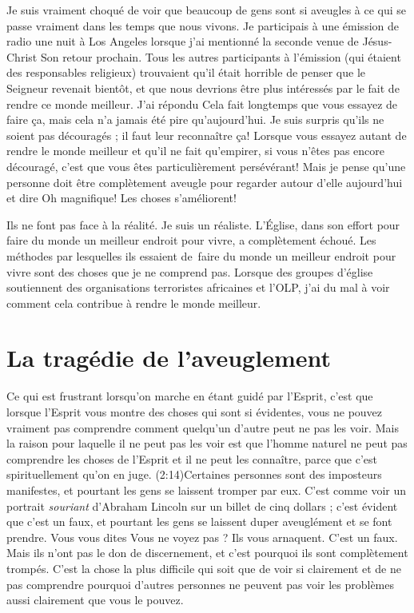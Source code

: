 Je suis vraiment choqué de voir que beaucoup de gens sont si aveugles à ce qui se passe
 vraiment dans les temps que nous vivons. Je participais à une émission de radio
 une nuit à Los Angeles lorsque j'ai mentionné la seconde venue
 de Jésus-Christ \ocadr Son retour prochain.
 Tous les autres participants à l'émission
 (qui étaient des responsables religieux) trouvaient qu'il était horrible
 de penser que le Seigneur revenait bientôt, et que nous devrions être plus
 intéressés par le fait de rendre ce monde meilleur. J'ai répondu\frcolon{}
 \Og Cela fait longtemps que vous essayez de faire ça, mais cela n'a jamais
 été pire qu'aujourd'hui. \Fg{}
 Je suis surpris qu'ils ne soient pas découragés ;
 il faut leur reconnaître ça!
 Lorsque vous essayez autant de rendre le monde meilleur et qu'il ne fait
 qu'empirer, si vous n'êtes pas encore découragé, c'est que vous êtes
 particulièrement persévérant!
 Mais je pense qu'une personne doit être complètement aveugle pour regarder
 autour d'elle aujourd'hui et dire\frcolon{}
 \Og Oh magnifique! Les choses s'améliorent! \Fg{}

Ils ne font pas face à la réalité. Je suis un réaliste.
 L'Église, dans son effort pour faire du monde un meilleur endroit
 pour vivre, a complètement échoué.
 Les méthodes par lesquelles ils essaient de~faire du monde un meilleur
 endroit pour vivre sont des choses que je ne comprend pas.
 Lorsque des groupes d'église soutiennent des organisations terroristes
 africaines et l'OLP,
 j'ai du mal à voir comment cela contribue à rendre le monde meilleur.

\section{La trag\'edie de l'aveuglement}

Ce qui est frustrant lorsqu'on marche en étant guidé par l'Esprit,
 c'est que lorsque l'Esprit vous montre des choses qui sont si évidentes,
 vous ne pouvez vraiment pas comprendre comment quelqu'un d'autre
 peut ne pas les voir. Mais la raison pour laquelle il ne peut pas les voir
 est que l'homme naturel ne peut pas comprendre les choses de l'Esprit\frcolon{}
 \Og [\dots{}] et il ne peut les connaître, parce que c'est spirituellement
 qu'on en juge. \Fg{}
 (2:14)Certaines personnes sont des imposteurs manifestes,
 et pourtant les gens se laissent tromper par eux.
 C'est comme voir un portrait \emph{souriant} d'Abraham Lincoln
 sur un billet de cinq dollars ; c'est évident que c'est un faux,
 et pourtant les gens se laissent duper aveuglément et se font prendre.
 Vous vous dites\frcolon{} \Og Vous ne voyez pas ? Ils vous arnaquent.
 C'est un faux. \Fg{}
 Mais ils n'ont pas le don de discernement, et c'est pourquoi ils sont
 complètement trompés.
 C'est la chose la plus difficile qui soit que de voir si clairement
 et de ne pas comprendre pourquoi d'autres personnes ne peuvent
 pas voir les problèmes aussi clairement que vous le pouvez.

